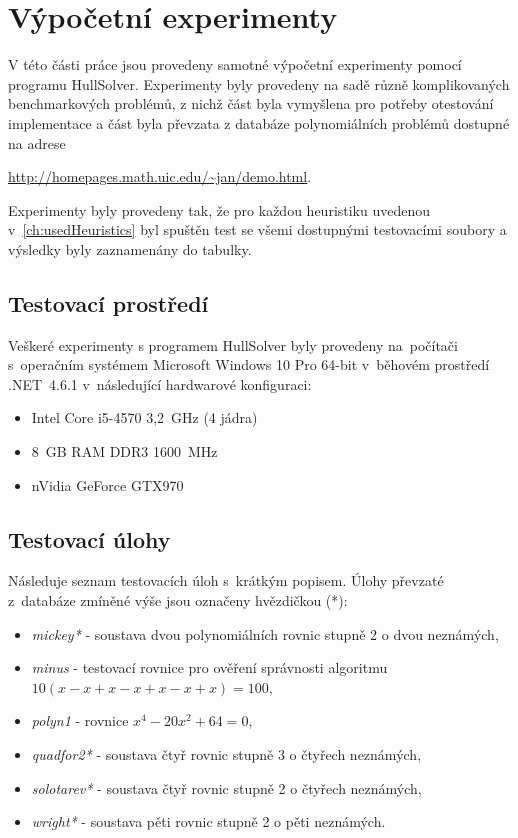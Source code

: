 


\chapter{Výpočetní experimenty}
V této části práce jsou provedeny samotné výpočetní experimenty pomocí programu HullSolver. Experimenty byly provedeny na sadě různě komplikovaných benchmarkových problémů, z nichž část byla vymyšlena pro potřeby otestování implementace a část byla převzata z databáze polynomiálních problémů dostupné na adrese {\url{http://homepages.math.uic.edu/~jan/demo.html}.

Experimenty byly provedeny tak, že pro každou heuristiku uvedenou v~\ref{ch:usedHeuristics} byl spuštěn test se všemi dostupnými testovacími soubory a výsledky byly zaznamenány do tabulky.


\section{Testovací prostředí}
Veškeré experimenty s programem HullSolver byly provedeny na~počítači s~operačním systémem Microsoft Windows 10 Pro 64-bit v~běhovém prostředí .NET~4.6.1 v~následující hardwarové konfiguraci:

\begin{itemize}
\item Intel Core i5-4570 3,2~GHz (4 jádra)
\item 8~GB RAM DDR3 1600~MHz
\item nVidia GeForce GTX970
\end{itemize}

\section{Testovací úlohy}

Následuje seznam testovacích úloh s~krátkým popisem. Úlohy převzaté z~databáze zmíněné výše jsou označeny hvězdičkou (*):

\begin{itemize}
    \item \emph{mickey*} - soustava dvou polynomiálních rovnic stupně 2 o dvou neznámých,
    \item \emph{minus} - testovací rovnice pro ověření správnosti algoritmu $10(x - x + x - x + x - x + x) = 100$,
    \item \emph{polyn1} - rovnice $x^4 - 20x^2 + 64 = 0$,
    \item \emph{quadfor2*} - soustava čtyř rovnic stupně 3 o čtyřech neznámých,
    \item \emph{solotarev*} - soustava čtyř rovnic stupně 2 o čtyřech neznámých,
    \item \emph{wright*} - soustava pěti rovnic stupně 2 o pěti neznámých.
\end{itemize}

}
